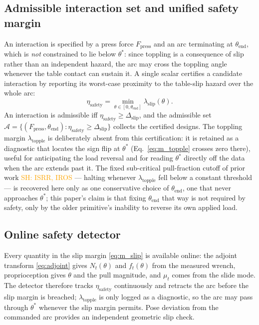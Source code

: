 \documentclass[10pt, conference]{IEEEtran}
\newcommand{\sh}[1]{\textcolor{orange}{SH: #1}}
\begin{document}
\subsection{Admissible interaction set and unified safety margin}

An interaction is specified by a press force $F_{\mathrm{press}}$ and an arc terminating at $\theta_{\mathrm{end}}$, which is \emph{not} constrained to lie below $\theta^{*}$: since toppling is a consequence of slip rather than an independent hazard, the arc may cross the toppling angle whenever the table contact can sustain it. A single scalar certifies a candidate interaction by reporting its worst-case proximity to the table-slip hazard over the whole arc:
\begin{equation}
    \eta_{\mathrm{safety}}
    = \min_{\theta \in [0,\theta_{\mathrm{end}}]} \lambda_{\mathrm{slip}}(\theta).
    \label{eq:eta}
\end{equation}
An interaction is admissible iff $\eta_{\mathrm{safety}} \ge \Delta_{\mathrm{slip}}$, and the admissible set $\mathcal{A} = \{ (F_{\mathrm{press}}, \theta_{\mathrm{end}}) : \eta_{\mathrm{safety}} \ge \Delta_{\mathrm{slip}} \}$ collects the certified designs. The toppling margin $\lambda_{\mathrm{topple}}$ is deliberately absent from this certification: it is retained as a diagnostic that locates the sign flip at $\theta^{*}$ (Eq.~\eqref{eq:m_topple} crosses zero there), useful for anticipating the load reversal and for reading $\theta^{*}$ directly off the data when the arc extends past it. The fixed sub-critical pull-fraction cutoff of prior work \sh{ISRR, IROS} --- halting whenever $\lambda_{\mathrm{topple}}$ fell below a constant threshold --- is recovered here only as one conservative choice of $\theta_{\mathrm{end}}$, one that never approaches $\theta^{*}$; this paper's claim is that fixing $\theta_{\mathrm{end}}$ that way is not required by safety, only by the older primitive's inability to reverse its own applied load.

\subsection{Online safety detector}

Every quantity in the slip margin \eqref{eq:m_slip} is available online: the adjoint transform \eqref{eq:adjoint} gives $N_t(\theta)$ and $f_t(\theta)$ from the measured wrench, proprioception gives $\theta$ and the pull magnitude, and $\mu_t$ comes from the slide mode. The detector therefore tracks $\eta_{\mathrm{safety}}$ continuously and retracts the arc before the slip margin is breached; $\lambda_{\mathrm{topple}}$ is only logged as a diagnostic, so the arc may pass through $\theta^{*}$ whenever the slip margin permits. Pose deviation from the commanded arc provides an independent geometric slip check.
\end{document}
